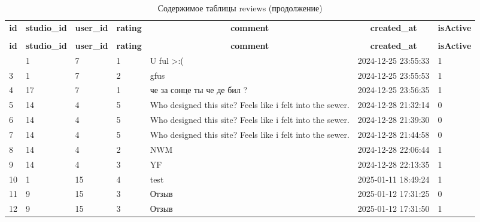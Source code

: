 %
%
 \begin{longtable}{|l|l|l|l|l|l|l|} 
 \hline \endhead \hline \endfoot \hline 
 \caption{Содержимое таблицы reviews} \label{tab:reviews-data} \\\hline \multicolumn{1}{|c|}{\textbf{id}} & \multicolumn{1}{|c|}{\textbf{studio\_id}} & \multicolumn{1}{|c|}{\textbf{user\_id}} & \multicolumn{1}{|c|}{\textbf{rating}} & \multicolumn{1}{|c|}{\textbf{comment}} & \multicolumn{1}{|c|}{\textbf{created\_at}} & \multicolumn{1}{|c|}{\textbf{isActive}} \\ \hline \hline  \endfirsthead 
\caption{Содержимое таблицы reviews (продолжение)} \\ \hline \multicolumn{1}{|c|}{\textbf{id}} & \multicolumn{1}{|c|}{\textbf{studio\_id}} & \multicolumn{1}{|c|}{\textbf{user\_id}} & \multicolumn{1}{|c|}{\textbf{rating}} & \multicolumn{1}{|c|}{\textbf{comment}} & \multicolumn{1}{|c|}{\textbf{created\_at}} & \multicolumn{1}{|c|}{\textbf{isActive}} \\ \hline \hline \endhead \endfoot
2 & 1 & 7 & 1 & U ful >:( & 2024-12-25 23:55:33 & 1 \\ \hline 
3 & 1 & 7 & 2 & gfus & 2024-12-25 23:55:53 & 1 \\ \hline 
4 & 17 & 7 & 1 & че за сонце ты че де бил ? & 2024-12-25 23:56:35 & 1 \\ \hline 
5 & 14 & 4 & 5 & Who designed this site? Feels like i felt into the sewer. & 2024-12-28 21:32:14 & 0 \\ \hline 
6 & 14 & 4 & 5 & Who designed this site? Feels like i felt into the sewer. & 2024-12-28 21:39:30 & 0 \\ \hline 
7 & 14 & 4 & 5 & Who designed this site? Feels like i felt into the sewer. & 2024-12-28 21:44:58 & 0 \\ \hline 
8 & 14 & 4 & 2 & NWM & 2024-12-28 22:06:44 & 1 \\ \hline 
9 & 14 & 4 & 3 & YF & 2024-12-28 22:13:35 & 1 \\ \hline 
10 & 1 & 15 & 4 & test & 2025-01-11 18:49:24 & 1 \\ \hline 
11 & 9 & 15 & 3 & Отзыв & 2025-01-12 17:31:25 & 0 \\ \hline 
12 & 9 & 15 & 3 & Отзыв & 2025-01-12 17:31:50 & 1 \\ \hline 
 \end{longtable}

